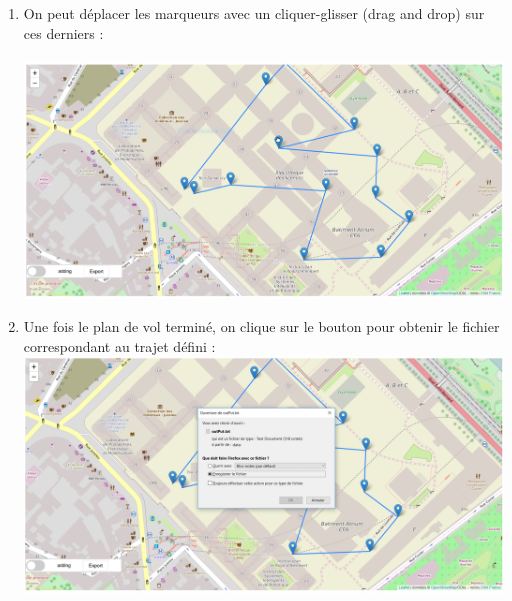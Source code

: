 \documentclass{article}
\begin{document}
\begin{enumerate}
 \item On peut déplacer les marqueurs avec un cliquer-glisser (drag and drop) sur ces derniers :\\ \\
 \includegraphics[scale=0.42]{capt7.PNG}
  \item Une fois le plan de vol terminé, on clique sur le bouton pour obtenir le fichier correspondant au trajet défini :\\
 \includegraphics[scale=0.42]{capt8.PNG}

 \end{enumerate}
\end{document}
